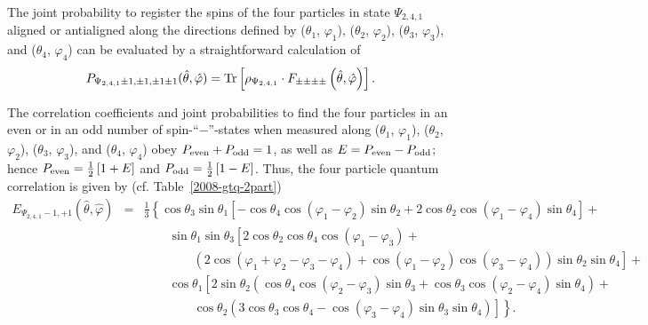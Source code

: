 \documentclass[fleqn,twoside]{article}      %
\begin{document}
The joint probability to register the spins of the four particles
in state $\Psi_{2,4,1}$
aligned or antialigned along the directions defined by
($\theta_1$, $\varphi_1 $),
($\theta_2$, $\varphi_2 $),
($\theta_3$, $\varphi_3 $),  and
($\theta_4$, $\varphi_4 $) can be evaluated by a straightforward calculation
of
\begin{equation}
P_{{\Psi_{2,4,1}} \pm 1 ,\pm 1,\pm 1\pm 1} ({\hat \theta},{\hat \varphi} )=
{\rm Tr}\left[\rho_{\Psi_{2,4,1}} \cdot F_{\pm \pm \pm \pm} \left({\hat \theta},{\hat \varphi} \right)\right].
\end{equation}

The correlation coefficients and joint probabilities to find the four particles
in an even or in an odd number of
spin-``$-$''-states when measured along
($\theta_1$, $\varphi_1 $),
($\theta_2$, $\varphi_2 $),
($\theta_3$, $\varphi_3 $),  and
($\theta_4$, $\varphi_4 $)
obey  $P_{ \rm even} + P_{ \rm odd}=1$,
as well as $E= P_{ \rm even} - P_{ \rm odd}$; hence
$
P_{ \rm even} =
{1\over2}\left[1 + E  \right]
$
and
$
P_{\rm odd} =
{1\over2}\left[1 - E  \right]
$.
Thus, the four particle quantum correlation is given by (cf. Table~\ref{2008-gtq-2part})
\begin{equation}
\begin{array}{rcl}
E_{ \Psi_{2,4,1}-1,+1}({\hat \theta} , {\hat \varphi } )  &=&
\frac{1}{3}
\left\{
\cos \theta_3 \sin \theta_1
\left[
-\cos \theta_4 \cos (\varphi_1 - \varphi_2) \sin \theta_2 +
          2 \cos \theta_2 \cos (\varphi_1 - \varphi_4) \sin \theta_4
\right] +
\right.
\\
&&\qquad
    \sin \theta_1 \sin \theta_3
\left[2 \cos \theta_2 \cos \theta_4 \cos (\varphi_1 - \varphi_3)  +
\right.
\\
&&\qquad
\qquad
\left.
\left(
2 \cos (\varphi_1 + \varphi_2 - \varphi_3 - \varphi_4) +
                \cos (\varphi_1 - \varphi_2)
                \cos (\varphi_3 - \varphi_4)
\right) \sin \theta_2 \sin \theta_4
\right]   +
\\
&&\qquad
    \cos \theta_1
\left[
2 \sin \theta_2
\left(
\cos \theta_4 \cos (\varphi_2 - \varphi_3) \sin \theta_3 +
                \cos \theta_3 \cos (\varphi_2 - \varphi_4) \sin \theta_4
\right) \right.
 +
\\
&&\qquad
\qquad
\left.
\left.
\cos \theta_2
\left(3 \cos \theta_3 \cos \theta_4 -
                \cos (\varphi_3 - \varphi_4) \sin \theta_3
\sin \theta_4
\right)
\right]
\right\} .
\end{array}
\label{2009-gtq-fpqcgen}
\end{equation}
\end{document}
